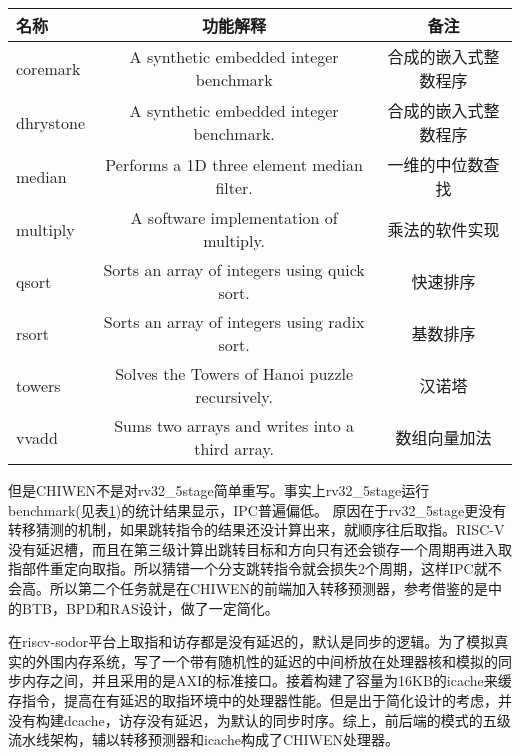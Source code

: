 	\begin{table}[!htbp]
		\label{tab:benchmark}
		\centering
		\footnotesize%
		\setlength{\tabcolsep}{4pt}%
		\renewcommand{\arraystretch}{1.2}%
		\begin{tabular}{lcc}
			\hline
			名称 & 功能解释 & 备注 \\%
			\hline
			coremark    & A synthetic embedded integer benchmark      & 合成的嵌入式整数程序 \\
			dhrystone   & A synthetic embedded integer benchmark.     & 合成的嵌入式整数程序 \\
			median 		& Performs a 1D three element median filter.  & 一维的中位数查找 \\
			multiply 	& A software implementation of multiply.      & 乘法的软件实现 \\
			qsort  		& Sorts an array of integers using quick sort. & 快速排序 \\
			rsort  		& Sorts an array of integers using radix sort. & 基数排序 \\
			towers 		& Solves the Towers of Hanoi puzzle recursively. & 汉诺塔 \\
			vvadd 		& Sums two arrays and writes into a third array. & 数组向量加法 \\
			\hline
		\end{tabular}
	\end{table}

	但是CHIWEN不是对rv32\_5stage简单重写。事实上rv32\_5stage运行benchmark(见表\ref{tab:benchmark})的统计结果显示，IPC普遍偏低。%
	原因在于rv32\_5stage更没有转移猜测的机制，如果跳转指令的结果还没计算出来，就顺序往后取指。RISC-V没有延迟槽，而且在第三级计算出跳转目标和方向只有还会锁存一个周期再进入取指部件重定向取指。所以猜错一个分支跳转指令就会损失2个周期，这样IPC就不会高。所以第二个任务就是在CHIWEN的前端加入转移预测器，参考借鉴的是\citet{Celio:EECS-2017-157}中的BTB，BPD和RAS设计，做了一定简化。
	
	在riscv-sodor平台上取指和访存都是没有延迟的，默认是同步的逻辑。为了模拟真实的外围内存系统，写了一个带有随机性的延迟的中间桥放在处理器核和模拟的同步内存之间，并且采用的是AXI的标准接口。接着构建了容量为16KB的icache来缓存指令，提高在有延迟的取指环境中的处理器性能。但是出于简化设计的考虑，并没有构建dcache，访存没有延迟，为默认的同步时序。综上，前后端的模式的五级流水线架构，辅以转移预测器和icache构成了CHIWEN处理器。
	
